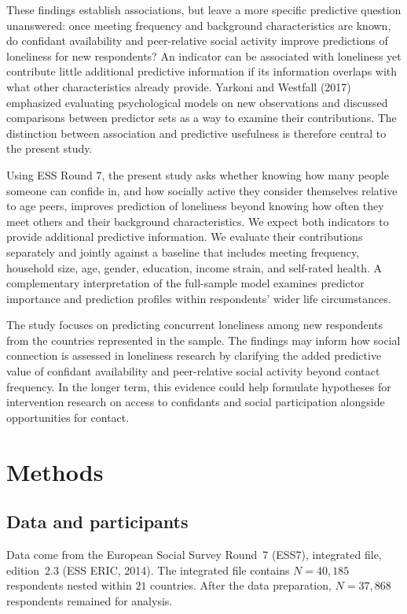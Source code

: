 \documentclass[12pt]{article}
\begin{document}
These findings establish associations, but leave a more specific predictive question
unanswered: once meeting frequency and background characteristics are known, do confidant
availability and peer-relative social activity improve predictions of loneliness for new
respondents? An indicator can be associated with loneliness yet contribute little
additional predictive information if its information overlaps with what other
characteristics already provide. Yarkoni and Westfall (2017) emphasized evaluating
psychological models on new observations and discussed comparisons between predictor sets
as a way to examine their contributions. The distinction between association and
predictive usefulness is therefore central to the present study.

Using ESS Round 7, the present study asks whether knowing how many people someone can
confide in, and how socially active they consider themselves relative to age peers,
improves prediction of loneliness beyond knowing how often they meet others and their
background characteristics. We expect both indicators to provide additional predictive
information. We evaluate their contributions separately and jointly against a baseline
that includes meeting frequency, household size, age, gender, education, income strain,
and self-rated health. A complementary interpretation of the full-sample model examines
predictor importance and prediction profiles within respondents' wider life
circumstances.

The study focuses on predicting concurrent loneliness among new respondents from the
countries represented in the sample. The findings may inform how social connection is
assessed in loneliness research by clarifying the added predictive value of confidant
availability and peer-relative social activity beyond contact frequency. In the longer
term, this evidence could help formulate hypotheses for intervention research on access
to confidants and social participation alongside opportunities for contact.

\section{Methods}

\subsection{Data and participants}

Data come from the European Social Survey Round~7 (ESS7), integrated file, edition~2.3
(ESS ERIC, 2014). The integrated file contains $N=40{,}185$ respondents nested within
$21$ countries. After the data preparation, $N=37{,}868$ respondents remained for analysis.
\end{document}
